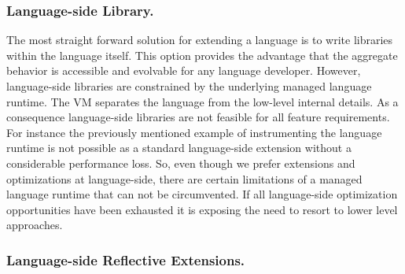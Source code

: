 \subsubsection{Language-side Library.}

The most straight forward solution for extending a language is to write libraries within the language itself. 
This option provides the advantage that the aggregate behavior is accessible and evolvable for any language developer.
However, language-side libraries are constrained by the underlying managed language runtime.
The VM separates the language from the low-level internal details.
As a consequence language-side libraries are not feasible for all feature requirements.
For instance the previously mentioned example of instrumenting the language runtime is not possible as a standard language-side extension without a considerable performance loss.
So, even though we prefer extensions and optimizations at language-side, there are certain limitations of a managed language runtime that can not be circumvented.
If all language-side optimization opportunities have been exhausted it is exposing the need to resort to lower level approaches.


\vspace{-2mm}
\subsubsection{Language-side Reflective Extensions.}

